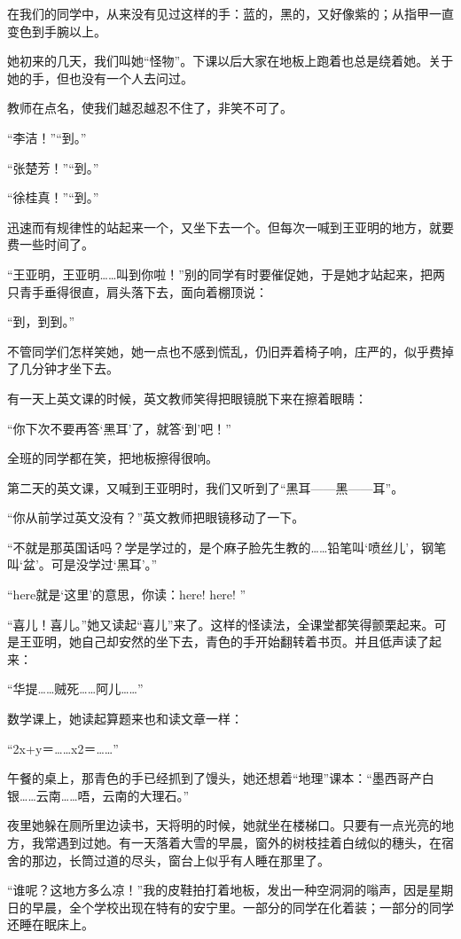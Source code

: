 \par 在我们的同学中，从来没有见过这样的手：蓝的，黑的，又好像紫的；从指甲一直变色到手腕以上。
\par 她初来的几天，我们叫她“怪物”。下课以后大家在地板上跑着也总是绕着她。关于她的手，但也没有一个人去问过。
\par 教师在点名，使我们越忍越忍不住了，非笑不可了。
\par “李洁！”“到。”
\par “张楚芳！”“到。”
\par “徐桂真！”“到。”
\par 迅速而有规律性的站起来一个，又坐下去一个。但每次一喊到王亚明的地方，就要费一些时间了。
\par “王亚明，王亚明……叫到你啦！”别的同学有时要催促她，于是她才站起来，把两只青手垂得很直，肩头落下去，面向着棚顶说：
\par “到，到到。”
\par 不管同学们怎样笑她，她一点也不感到慌乱，仍旧弄着椅子响，庄严的，似乎费掉了几分钟才坐下去。
\par 有一天上英文课的时候，英文教师笑得把眼镜脱下来在擦着眼睛：
\par “你下次不要再答‘黑耳’了，就答‘到’吧！”
\par 全班的同学都在笑，把地板擦得很响。
\par 第二天的英文课，又喊到王亚明时，我们又听到了“黑耳——黑——耳”。
\par “你从前学过英文没有？”英文教师把眼镜移动了一下。
\par “不就是那英国话吗？学是学过的，是个麻子脸先生教的……铅笔叫‘喷丝儿’，钢笔叫‘盆’。可是没学过‘黑耳’。”
\par “here就是‘这里’的意思，你读：here! here! ”
\par “喜儿！喜儿。”她又读起“喜儿”来了。这样的怪读法，全课堂都笑得颤栗起来。可是王亚明，她自己却安然的坐下去，青色的手开始翻转着书页。并且低声读了起来：
\par “华提……贼死……阿儿……”
\par 数学课上，她读起算题来也和读文章一样：
\par “2x+y＝……x2＝……”
\par 午餐的桌上，那青色的手已经抓到了馒头，她还想着“地理”课本：“墨西哥产白银……云南……唔，云南的大理石。”
\par 夜里她躲在厕所里边读书，天将明的时候，她就坐在楼梯口。只要有一点光亮的地方，我常遇到过她。有一天落着大雪的早晨，窗外的树枝挂着白绒似的穗头，在宿舍的那边，长筒过道的尽头，窗台上似乎有人睡在那里了。
\par “谁呢？这地方多么凉！”我的皮鞋拍打着地板，发出一种空洞洞的嗡声，因是星期日的早晨，全个学校出现在特有的安宁里。一部分的同学在化着装；一部分的同学还睡在眠床上。
